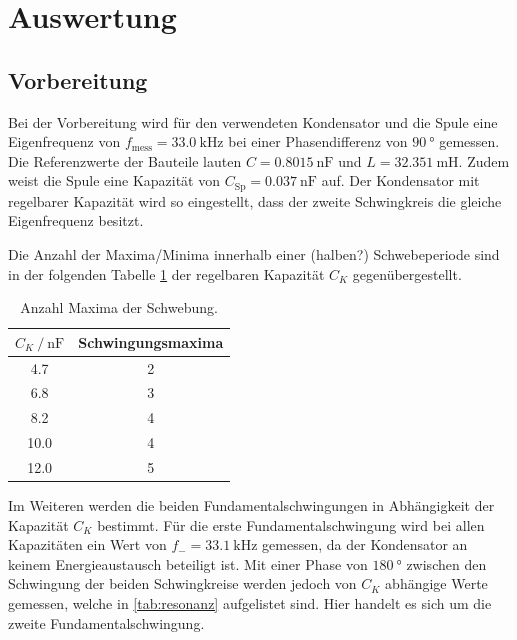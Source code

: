 \section{Auswertung}
\label{sec:Auswertung}

\subsection{Vorbereitung}
Bei der Vorbereitung wird für den verwendeten Kondensator und die Spule eine Eigenfrequenz von 
$f_{\text{mess}}=\SI{33.0}{\kilo\hertz}$ bei einer Phasendifferenz von $\SI{90}{\degree}$ gemessen. 
Die Referenzwerte der Bauteile lauten $C=\SI{0.8015}{\nano\farad}$ und $L=\SI{32.351}{\milli\henry}$. 
Zudem weist die Spule eine Kapazität von $C_\text{Sp}=\SI{0.037}{\nano\farad}$ auf.
Der Kondensator mit regelbarer Kapazität wird so eingestellt, dass der zweite Schwingkreis die gleiche Eigenfrequenz besitzt.

Die Anzahl der Maxima/Minima innerhalb einer (halben?) Schwebeperiode sind in der folgenden Tabelle \ref{tab:schwing_maxima} der regelbaren Kapazität $C_K$ gegenübergestellt.

\begin{table}
    \centering
    \caption{Anzahl Maxima der Schwebung.}
    \label{tab:schwing_maxima}
    \begin{tabular}{c c}
        \toprule
        {$C_K \:/\: \si{\nano\farad}$} & Schwingungsmaxima \\
        \midrule
        4.7  & 2 \\ 
        6.8  & 3 \\ 
        8.2  & 4 \\ 
        10.0 & 4 \\ 
        12.0 & 5 \\ 
        \bottomrule
    \end{tabular}
\end{table}

Im Weiteren werden die beiden Fundamentalschwingungen in Abhängigkeit der Kapazität $C_K$ bestimmt.
Für die erste Fundamentalschwingung wird bei allen Kapazitäten ein Wert von $f_- = \SI{33.1}{\kilo\hertz}$ gemessen, da der Kondensator an keinem Energieaustausch beteiligt ist.
Mit einer Phase von $\SI{180}{\degree}$ zwischen den Schwingung der beiden Schwingkreise werden jedoch von $C_K$ abhängige Werte gemessen, welche in \ref{tab:resonanz} aufgelistet sind.
Hier handelt es sich um die zweite Fundamentalschwingung.

